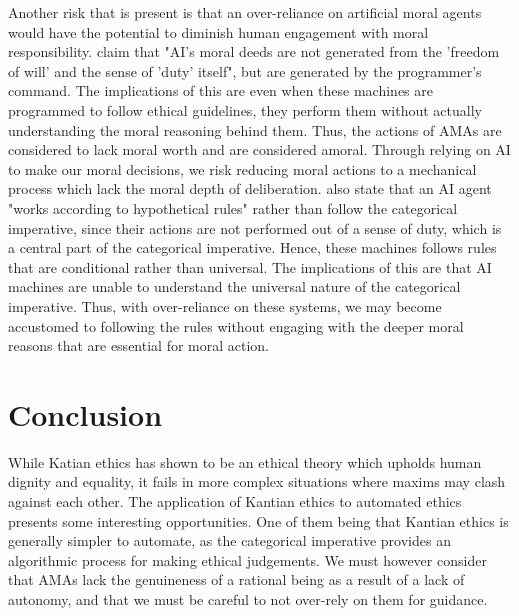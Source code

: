 \documentclass{article}
\begin{document}
Another risk that is present is that an over-reliance on artificial moral agents would have the potential to diminish human engagement
with moral responsibility. \textcite[p. 146]{mannananth2021} claim that "AI's moral deeds are not generated from
the 'freedom of will' and the sense of 'duty' itself", but are generated by the programmer's command. The 
implications of this are even when these machines are programmed to follow ethical guidelines, they perform
them without actually understanding the moral reasoning behind them. Thus, the actions of AMAs are considered to
lack moral worth and are considered amoral. Through relying on AI to make our moral decisions, we risk reducing moral
actions to a mechanical process which lack the moral depth of deliberation. \textcite[p. 148]{mannananth2021} also state
that an AI agent "works according to hypothetical rules" rather than follow the categorical imperative, since their
actions are not performed out of a sense of duty, which is a central part of the categorical imperative. Hence, these
machines follows rules that are conditional rather than universal. The implications of this are that AI machines are
unable to understand the universal nature of the categorical imperative. Thus, with over-reliance on these systems,
we may become accustomed to following the rules without engaging with the deeper moral reasons that are essential for moral
action. 

\section{Conclusion}
While Katian ethics has shown to be an ethical theory which upholds human dignity and equality,
it fails in more complex situations where maxims may clash against each other. The application
of Kantian ethics to automated ethics presents some interesting opportunities. One of them 
being that Kantian ethics is generally simpler to automate, as the categorical imperative provides
an algorithmic process for making ethical judgements. We must however consider that AMAs 
lack the genuineness of a rational being as a result of a lack of autonomy, and that we must
be careful to not over-rely on them for guidance.

\printbibliography[title={References}]
\end{document}
